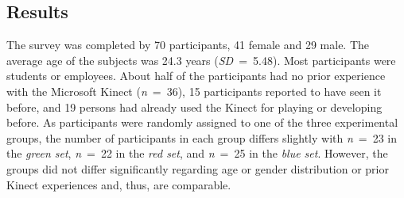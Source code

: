 \documentclass{sigchi}
\begin{document}
\subsection{Results}
The survey was completed by 70 participants, 41 female and 29 male. The average age of the subjects was 24.3 years (\textit{SD}~=~5.48). Most participants were students or employees. About half of the participants had no prior experience with the Microsoft Kinect (\textit{n}~=~36), 15 participants reported to have seen it before, and 19 persons had already used the Kinect for playing or developing before.
As participants were randomly assigned to one of the three experimental groups, the number of participants in each group differs slightly with \textit{n}~=~23 in the \textit{green set}, \textit{n}~=~22 in the \textit{red set}, and \textit{n}~=~25 in the \textit{blue set}. However, the groups did not differ significantly regarding age or gender distribution or prior Kinect experiences and, thus, are comparable.


%
%
\end{document}
